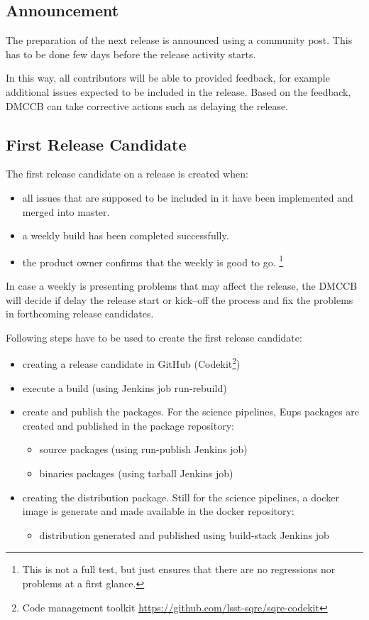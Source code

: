 \subsection{Announcement} \label{sec:anaouncement}

The preparation of the next release is announced using a community post.
This has to be done few days before the release activity starts.

In this way, all contributors will be able to provided feedback, for example additional issues expected to be included in the release.
Based on the feedback, DMCCB can take corrective actions such as delaying the release.


\subsection{First Release Candidate} \label{sec:firstrc}

The first release candidate on a release is created when:

\begin{itemize}
\item all issues that are supposed to be included in it have been implemented and merged into master.
\item a weekly build has been completed successfully.
\item the product owner confirms that the weekly is good to go. \footnote{This is not a full test, but just ensures that there are no regressions nor problems at a first glance.}
\end{itemize}

In case a weekly is presenting problems that may affect the release, the DMCCB will decide if delay the release start or kick--off the process and fix the problems in forthcoming release candidates.


Following steps have to be used to create the first release candidate:

\begin{itemize}
\item creating a release candidate in GitHub (Codekit\footnote{Code management toolkit \url{https://github.com/lsst-sqre/sqre-codekit}})
\item execute a build (using Jenkins job run-rebuild)
\item create and publish the packages. For the science pipelines, Eups packages are created and published in the package repository:
   \begin{itemize}
   \item source packages (using run-publish Jenkins job)
   \item binaries packages (using tarball Jenkins job)
   \end{itemize}
\item creating the distribution package. Still for the science pipelines, a docker image is generate and made available in the docker repository:
   \begin{itemize}
   \item distribution generated and published using build-stack Jenkins job
   \end{itemize}
\end{itemize}


